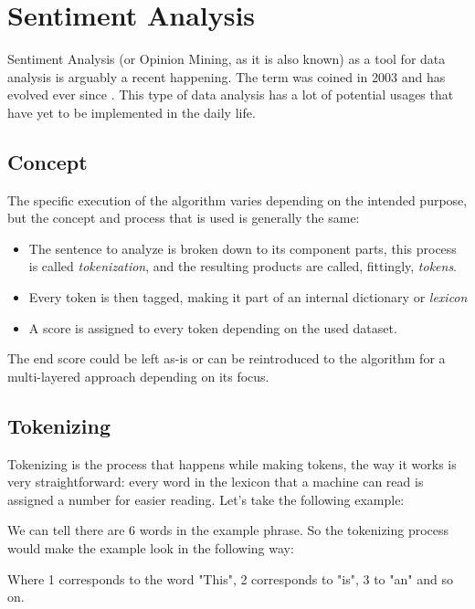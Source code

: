 \section{Sentiment Analysis}
Sentiment Analysis (or Opinion Mining, as it is also known) as a tool for data analysis is arguably a recent happening. The term was coined in 2003 and has evolved ever since \citep{rf3}.
This type of data analysis has a lot of potential usages that have yet to be implemented in the daily life.

\subsection{Concept}
The specific execution of the algorithm varies depending on the intended purpose, but the concept and process that is used is generally the same:
\begin{itemize}
	\item The sentence to analyze is broken down to its component parts, this process is called \textit{tokenization}, and the resulting products are called, fittingly, \textit{tokens}.
	\item Every token is then tagged, making it part of an internal dictionary or \textit{lexicon}
	\item A score is assigned to every token depending on the used dataset.
\end{itemize}
The end score could be left as-is or can be reintroduced to the algorithm for a multi-layered approach depending on its focus. \citep{rf4}

\subsection{Tokenizing}
Tokenizing is the process that happens while making tokens, the way it works is very straightforward: every word in the lexicon that a machine can read is assigned a number for easier reading. Let's take the following example:
\begin{center}
\end{center}

We can tell there are 6 words in the example phrase. So the tokenizing process would make the example look in the following way:
\begin{center}
\end{center}

Where 1 corresponds to the word "This", 2 corresponds to "is", 3 to "an" and so on.

